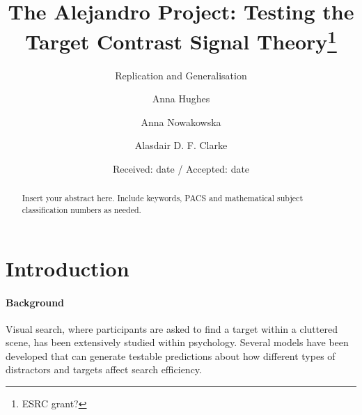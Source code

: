 \documentclass[smallextended]{svjour3}       %
\begin{document}
\title{The Alejandro Project: Testing the Target Contrast Signal Theory\thanks{ESRC grant?}
}
\subtitle{Replication and Generalisation}


\author{Anna Hughes \and Anna Nowakowska \and Alasdair D. F. Clarke}



\date{Received: date / Accepted: date}

\maketitle

\begin{abstract}
Insert your abstract here. Include keywords, PACS and mathematical
subject classification numbers as needed.
\end{abstract}

\section{Introduction}
\label{intro}

\paragraph{Background}
Visual search, where participants are asked to find a target within a cluttered scene, has been extensively studied within psychology. Several models have been developed that can generate testable predictions about how different types of distractors and targets affect search efficiency.
\end{document}
